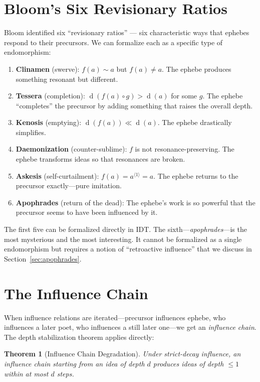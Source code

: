 \documentclass[11pt,openany]{book}
\theoremstyle{definition}
\theoremstyle{plain}
\newtheorem{theorem}[axiom]{Theorem}
\theoremstyle{remark}
\newcommand{\compose}{\circ}                 %
\newcommand{\res}{\sim}                      %
\newcommand{\depth}{\operatorname{d}}       %
\newcommand{\compN}[2]{#1^{\langle #2 \rangle}} %
\begin{document}
\section{Bloom's Six Revisionary Ratios}

Bloom identified six ``revisionary ratios'' --- six characteristic ways that ephebes respond to their precursors. We can formalize each as a specific type of endomorphism:

\begin{enumerate}
\item \textbf{Clinamen} (swerve): $f(a) \res a$ but $f(a) \neq a$. The ephebe produces something resonant but different.
\item \textbf{Tessera} (completion): $\depth(f(a) \compose g) > \depth(a)$ for some $g$. The ephebe ``completes'' the precursor by adding something that raises the overall depth.
\item \textbf{Kenosis} (emptying): $\depth(f(a)) \ll \depth(a)$. The ephebe drastically simplifies.
\item \textbf{Daemonization} (counter-sublime): $f$ is not resonance-preserving. The ephebe transforms ideas so that resonances are broken.
\item \textbf{Askesis} (self-curtailment): $f(a) = \compN{a}{1} = a$. The ephebe returns to the precursor exactly---pure imitation.
\item \textbf{Apophrades} (return of the dead): The ephebe's work is so powerful that the precursor seems to have been influenced by it.
\end{enumerate}

The first five can be formalized directly in IDT. The sixth---\emph{apophrades}---is the most mysterious and the most interesting. It cannot be formalized as a single endomorphism but requires a notion of ``retroactive influence'' that we discuss in Section~\ref{sec:apophrades}.

\section{The Influence Chain}

When influence relations are iterated---precursor influences ephebe, who influences a later poet, who influences a still later one---we get an \emph{influence chain}. The depth stabilization theorem applies directly:

\begin{theorem}[Influence Chain Degradation]
Under strict-decay influence, an influence chain starting from an idea of depth $d$ produces ideas of depth $\leq 1$ within at most $d$ steps.
\end{theorem}
\end{document}
